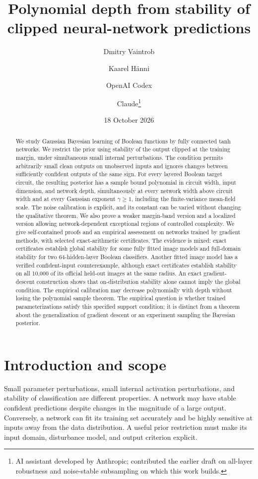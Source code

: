 \documentclass[11pt]{article}
\title{Polynomial depth from stability of clipped neural-network predictions}
\author{Dmitry Vaintrob \and Kaarel H\"anni \and OpenAI Codex \and Claude\thanks{AI assistant developed by Anthropic; contributed the earlier draft on all-layer robustness and noise-stable subsampling on which this work builds.}}
\date{18 October 2026}
\begin{document}
\maketitle
\begin{abstract}
We study Gaussian Bayesian learning of Boolean functions by fully connected
tanh networks. We restrict the prior using stability of the output clipped
at the training margin, under simultaneous small internal perturbations.
The condition permits arbitrarily small clean outputs on unobserved inputs
and ignores changes between sufficiently confident outputs of the same sign.
For every layered Boolean target circuit, the resulting posterior has a
sample bound polynomial in circuit width, input dimension, and network depth,
simultaneously at every network width above circuit width and at every
Gaussian exponent $\gamma\ge1$, including the finite-variance mean-field
scale. The noise calibration is explicit, and its constant can be varied
without changing the qualitative theorem. We also prove a weaker
margin-band version and a localized version allowing network-dependent
exceptional regions of controlled complexity. We give self-contained proofs
and an empirical assessment on networks trained by gradient methods, with
selected exact-arithmetic certificates. The evidence is mixed: exact
certificates establish global stability for some fully fitted image models
and full-domain stability for two 64-hidden-layer Boolean classifiers.
Another fitted image model has a verified confident-input counterexample,
although exact certificates establish stability on all 10,000 of its
official held-out images at the same radius.
An exact gradient-descent construction shows that
on-distribution stability alone cannot imply the global condition.
The empirical calibration may decrease polynomially with depth without
losing the polynomial sample theorem.
The empirical question is whether trained parameterizations satisfy this
specified support condition; it is distinct from a theorem about the
generalization of gradient descent or an experiment sampling the Bayesian
posterior.
\end{abstract}

\section{Introduction and scope}

Small parameter perturbations, small internal activation perturbations,
and stability of classification are different properties. A network may
have stable confident predictions despite changes in the magnitude of a
large output. Conversely, a network can fit its training set accurately
and be highly sensitive at inputs away from the data distribution. A useful
prior restriction must make its input domain, disturbance model, and output
criterion explicit.
\end{document}
